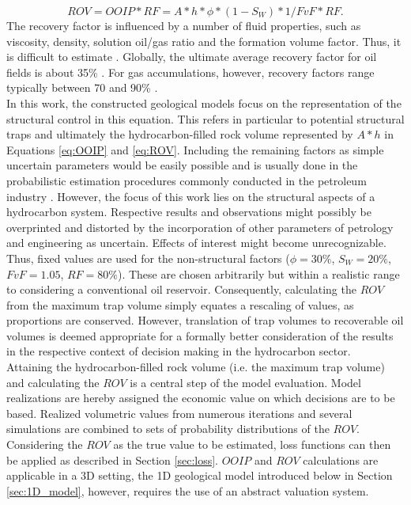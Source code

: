         \begin{equation}\label{eq:ROV}
                ROV = OOIP * RF = A * h * \phi * (1 - S_W) * 1/FvF * RF.
        \end{equation}
        The recovery factor is influenced by a number of fluid properties, such as viscosity, density, solution oil/gas ratio and the formation volume factor. Thus, it is difficult to estimate \citep{dean2007volumetric}. Globally, the ultimate average recovery factor for oil fields is about 35\% \citep{labastie2011increasingRF}. For gas accumulations, however, recovery factors range typically between 70 and 90\% \citep{dean2007volumetric}.\\
        In this work, the constructed geological models focus on the representation of the structural control in this equation. This refers in particular to potential structural traps and ultimately the hydrocarbon-filled rock volume represented by $A * h$ in Equations \ref{eq:OOIP} and \ref{eq:ROV}.
        Including the remaining factors as simple uncertain parameters would be easily possible and is usually done in the probabilistic estimation procedures commonly conducted in the petroleum industry \citep{wim2001guidelines}. However, the focus of this work lies on the structural aspects of a hydrocarbon system. Respective results and observations might possibly be overprinted and distorted by the incorporation of other parameters of petrology and engineering as uncertain. Effects of interest might become unrecognizable. Thus, fixed values are used for the non-structural factors ($\phi=30\%$, $S_W=20\%$, $FvF=1.05$, $RF = 80\%$). These are chosen arbitrarily but within a realistic range to considering a conventional oil reservoir. Consequently, calculating the $ROV$ from the maximum trap volume simply equates a rescaling of values, as proportions are conserved. However, translation of trap volumes to recoverable oil volumes is deemed appropriate for a formally better consideration of the results in the respective context of decision making in the hydrocarbon sector.\\
        Attaining the hydrocarbon-filled rock volume (i.e. the maximum trap volume) and calculating the $ROV$ is a central step of the model evaluation. Model realizations are hereby assigned the economic value on which decisions are to be based. Realized volumetric values from numerous iterations and several simulations are combined to sets of probability distributions of the $ROV$. Considering the $ROV$ as the true value to be estimated, loss functions can then be applied as described in Section \ref{sec:loss}. $OOIP$ and $ROV$ calculations are applicable in a 3D setting, the 1D geological model introduced below in Section \ref{sec:1D_model}, however, requires the use of an abstract valuation system.
		
